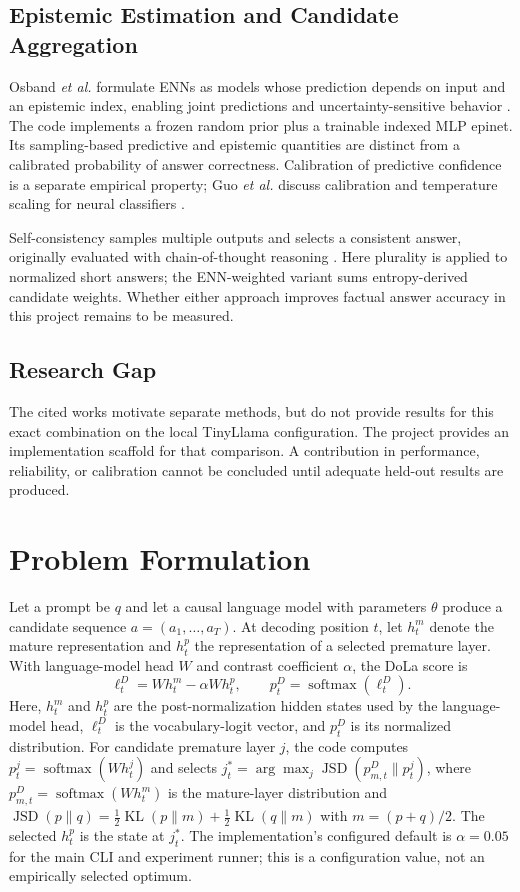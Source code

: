 \documentclass[conference]{IEEEtran}
\begin{document}
\subsection{Epistemic Estimation and Candidate Aggregation}
Osband \emph{et al.} formulate ENNs as models whose prediction depends on input and an epistemic index, enabling joint predictions and uncertainty-sensitive behavior \cite{osband2021enn}. The code implements a frozen random prior plus a trainable indexed MLP epinet. Its sampling-based predictive and epistemic quantities are distinct from a calibrated probability of answer correctness. Calibration of predictive confidence is a separate empirical property; Guo \emph{et al.} discuss calibration and temperature scaling for neural classifiers \cite{guo2017calibration}.

Self-consistency samples multiple outputs and selects a consistent answer, originally evaluated with chain-of-thought reasoning \cite{wang2023selfconsistency}. Here plurality is applied to normalized short answers; the ENN-weighted variant sums entropy-derived candidate weights. Whether either approach improves factual answer accuracy in this project remains to be measured.

\subsection{Research Gap}
The cited works motivate separate methods, but do not provide results for this exact combination on the local TinyLlama configuration. The project provides an implementation scaffold for that comparison. A contribution in performance, reliability, or calibration cannot be concluded until adequate held-out results are produced.

\section{Problem Formulation}
Let a prompt be $q$ and let a causal language model with parameters $\theta$ produce a candidate sequence $a=(a_1,\ldots,a_T)$. At decoding position $t$, let $h^m_t$ denote the mature representation and $h^{p}_t$ the representation of a selected premature layer. With language-model head $W$ and contrast coefficient $\alpha$, the DoLa score is
\begin{equation}
 \ell^{D}_t = W h^m_t - \alpha W h^{p}_t,\qquad p^D_t=\operatorname{softmax}(\ell^{D}_t).
 \label{eq:dola}
\end{equation}
Here, $h^m_t$ and $h^p_t$ are the post-normalization hidden states used by the language-model head, $\ell^D_t$ is the vocabulary-logit vector, and $p^D_t$ is its normalized distribution. For candidate premature layer $j$, the code computes $p^j_t=\operatorname{softmax}(W h^j_t)$ and selects $j_t^*=\arg\max_j \operatorname{JSD}(p^D_{m,t}\|p^j_t)$, where $p^D_{m,t}=\operatorname{softmax}(W h^m_t)$ is the mature-layer distribution and $\operatorname{JSD}(p\|q)=\tfrac12\operatorname{KL}(p\|m)+\tfrac12\operatorname{KL}(q\|m)$ with $m=(p+q)/2$. The selected $h^p_t$ is the state at $j_t^*$. The implementation's configured default is $\alpha=0.05$ for the main CLI and experiment runner; this is a configuration value, not an empirically selected optimum.
\end{document}
